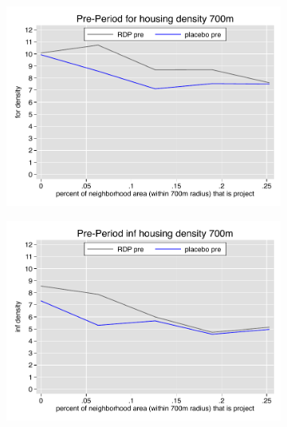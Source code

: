 \documentclass[12pt]{article}
\begin{document}
\begin{figure}
        \begin{subfigure}[b]{0.495\textwidth}
            \centering
            \includegraphics[width=\textwidth,trim={0.3cm .3cm 0.1cm 0cm}, clip=true]{figures/overlap_for_700_total_pre.pdf}
        \end{subfigure}
        \hfill
        \begin{subfigure}[b]{0.495\textwidth}  
            \centering 
            \includegraphics[width=\textwidth,trim={0.3cm .3cm 0.1cm 0cm}, clip=true]{figures/overlap_inf_700_total_pre.pdf}
        \end{subfigure}
        \vspace{-6mm}

\end{figure}
\end{document}
